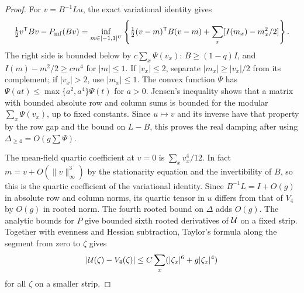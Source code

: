 \documentclass[11pt]{article}
\theoremstyle{definition}
\begin{document}
\begin{proof}
For \(v=B^{-1}Lu\), the exact variational identity gives
\begin{equation}
 \tfrac12 v^{\mathsf T} Bv-P_{\rm mf}(Bv)
   =\inf_{m\in[-1,1]^U}
      \left\{\tfrac12(v-m)^{\mathsf T}B(v-m)
                  +\sum_x [I(m_x)-m_x^2/2]\right\}.
\end{equation}
The right side is bounded below by \(c\sum_x\Psi(v_x)\):
\(B\ge (1-q)I\), and \(I(m)-m^2/2\ge c m^4\) for \(|m|\le1\).
If \(|v_x|\le2\), separate \(|m_x|\ge |v_x|/2\) from its
complement; if \(|v_x|>2\), use \(|m_x|\le1\).
The convex function \(\Psi\) has
\(\Psi(a t)\le \max\{a^2,a^4\}\Psi(t)\) for \(a>0\).
Jensen's inequality shows that a matrix with bounded
absolute row and column sums is bounded for the modular
\(\sum_x\Psi(v_x)\), up to fixed constants.
Since \(u\mapsto v\) and its inverse have that property
by the row gap and the bound on \(L-B\), this proves the
real damping after using \(\Delta_{\ge4}=O(g\sum\Psi)\).

The mean-field quartic coefficient at \(v=0\) is
\(\sum_x v_x^4/12\). In fact \(m=v+O(\|v\|_\infty^3)\)
by the stationarity equation and the invertibility of \(B\),
so this is the quartic coefficient of the variational
identity. Since \(B^{-1}L=I+O(g)\) in absolute row and
column norms, its quartic tensor in \(u\) differs from
that of \(V_4\) by \(O(g)\) in rooted norm.
The fourth rooted bound on \(\Delta\) adds \(O(g)\).
The analytic bounds for \(P\) give bounded sixth rooted
derivatives of \({\cal U}\) on a fixed strip. Together
with evenness and Hessian subtraction, Taylor's formula
along the segment from zero to \(\zeta\) gives
\begin{equation}
 |{\cal U}(\zeta)-V_4(\zeta)|
     \le C\sum_x (|\zeta_x|^6+g|\zeta_x|^4)
\end{equation}
for all \(\zeta\) on a smaller strip.


\end{proof}
\end{document}
